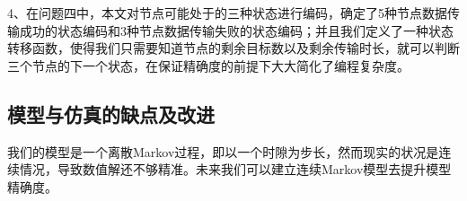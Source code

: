 \documentclass[bwprint]{gmcmthesis}
\begin{document}
4、在问题四中，本文对节点可能处于的三种状态进行编码，确定了5种节点数据传输成功的状态编码和3种节点数据传输失败的状态编码；并且我们定义了一种状态转移函数，使得我们只需要知道节点的剩余目标数以及剩余传输时长，就可以判断三个节点的下一个状态，在保证精确度的前提下大大简化了编程复杂度。

\subsection{模型与仿真的缺点及改进}

我们的模型是一个离散Markov过程，即以一个时隙为步长，然而现实的状况是连续情况，导致数值解还不够精准。未来我们可以建立连续Markov模型去提升模型精确度。


\newpage





\newpage
\appendix
\end{document}
